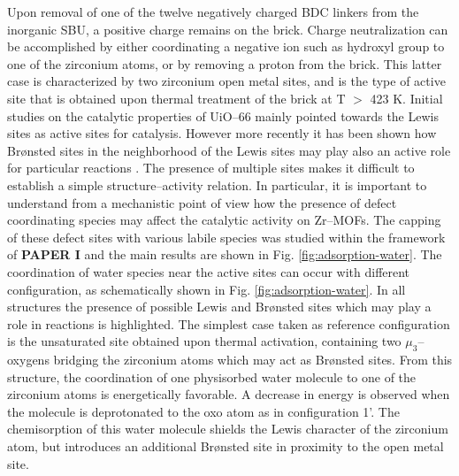 Upon removal of one of the twelve negatively charged BDC linkers from the inorganic  SBU, a positive charge remains on the brick. Charge neutralization can be accomplished by either coordinating a negative ion such as hydroxyl group to one of the zirconium atoms, or by removing a proton from the brick. This latter case is characterized by two zirconium open metal sites, and is the type of active site that is obtained upon thermal treatment of the brick at T $>$ 423 K. Initial studies on the catalytic properties of UiO--66 mainly pointed towards the Lewis sites as active sites for catalysis.  However more recently it has been shown how Br\o{}nsted sites in the neighborhood of the Lewis sites may play also an active role for particular reactions \cite{canivet2014water, oien2014detailed, canivet2016origin, ling2016dynamic, liu2016probing, klet2016evaluation, vandichel2016water, ghosh2014water}. The presence of multiple sites makes it difficult to establish a simple structure--activity relation. In particular, it is important to understand from a mechanistic point of view how the presence of defect coordinating species may affect the catalytic activity on Zr--MOFs. The capping of these defect sites with various labile species was studied within the framework of \textbf{PAPER I} and the main results are shown in Fig. \ref{fig:adsorption-water}.
\npar
The coordination of water species near the active sites can occur with different configuration, as schematically shown in Fig. \ref{fig:adsorption-water}. In all structures the presence of possible Lewis and Br\o{}nsted sites which may play a role in reactions is highlighted. The simplest case taken as reference configuration is the unsaturated site obtained upon thermal activation, containing two $\mu_3$--oxygens bridging the zirconium atoms which may act as Br\o{}nsted sites. From this structure, the coordination of one physisorbed water molecule to one of the zirconium atoms is energetically favorable. A decrease in energy is observed when the molecule is deprotonated to the oxo atom as in configuration 1’. The chemisorption of this water molecule shields the Lewis character of the zirconium atom, but introduces an additional Br\o{}nsted site in proximity to the open metal site. 
\npar
